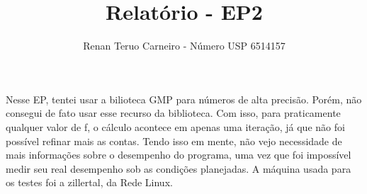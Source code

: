 \documentclass[a4paper,11pt]{article}
\title{Relatório - EP2}
\author{Renan Teruo Carneiro - Número USP 6514157}
\begin{document}
\maketitle

Nesse EP, tentei usar a bilioteca GMP para números de alta precisão. Porém, não consegui de fato usar esse recurso da biblioteca. Com isso, para praticamente qualquer valor de f, o cálculo acontece em apenas uma iteração, já que não foi possível refinar mais as contas. Tendo isso em mente, não vejo necessidade de mais informações sobre o desempenho do programa, uma vez que foi impossível medir seu real desempenho sob as condições planejadas. A máquina usada para os testes foi a zillertal, da Rede Linux.
\end{document}
